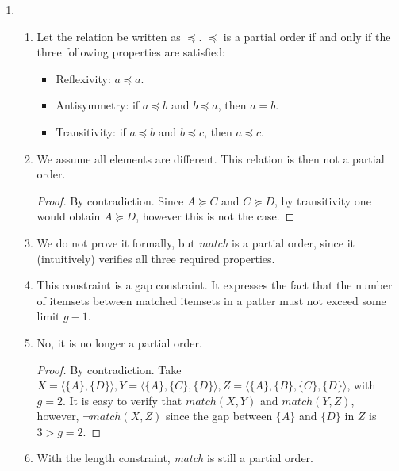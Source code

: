 \documentclass[pdf]{article}
\newcommand{\seq}[1]{\langle #1 \rangle}
\begin{document}
\begin{enumerate}
\begin{enumerate}
		This formalizes the intuition of anti-monotonicity: ``If a sequence is frequent, all sequences which are contained in it are also frequent; if a sequence is infrequent, all sequences in which it is contained are also infrequent.''
		\item No, there is no anti-monotonicity property.
		\begin{proof}
			By contradiction.
			Take the single transaction database \(\seq{\{A\}, \{B\}, \{B\}}\).
			For this database, \(\mathrm{support}(\seq{\{A\}}) = 1 < \mathrm{support}(\seq{\{A\}\{B\}}) = 2\), despite the fact that \(\seq{\{A\}} \subseteq \seq{\{A\}\{B\}}\).
		\end{proof}
	\end{enumerate}
	\item \begin{enumerate}
		\item Let the relation be written as \(\preceq\). \(\preceq\) is a partial order if and only if the three following properties are satisfied:
		\begin{itemize}
			\item Reflexivity: \(a \preceq a\).
			\item Antisymmetry: if \(a \preceq b\) and \(b \preceq a\), then \(a = b\).
			\item Transitivity: if \(a \preceq b\) and \(b \preceq c\), then \(a \preceq c\).
		\end{itemize}
		\item We assume all elements are different.
		This relation is then not a partial order.
		\begin{proof}
			By contradiction.
			Since \(A \succeq C\) and \(C \succeq D\), by transitivity one would obtain \(A \succeq D\), however this is not the case.
		\end{proof}
		\item We do not prove it formally, but \textit{match} is a partial order, since it (intuitively) verifies all three required properties.
		\item This constraint is a gap constraint.
		It expresses the fact that the number of itemsets between matched itemsets in a patter must not exceed some limit \(g - 1\).
		\item No, it is no longer a partial order.
		\begin{proof}
			By contradiction.
			Take \(X = \seq{\{A\}, \{D\}}, Y = \seq{\{A\}, \{C\}, \{D\}}, Z = \seq{\{A\}, \{B\}, \{C\}, \{D\}}\), with \(g=2\).
			It is easy to verify that \(\mathit{match}(X, Y)\) and \(\mathit{match}(Y, Z)\), however, \(\lnot \mathit{match}(X, Z)\) since the gap between \(\{A\}\) and \(\{D\}\) in \(Z\) is \(3 > g = 2\).
		\end{proof}
		\item With the length constraint, \textit{match} is still a partial order.
		

\end{enumerate}
\end{enumerate}
\end{document}
